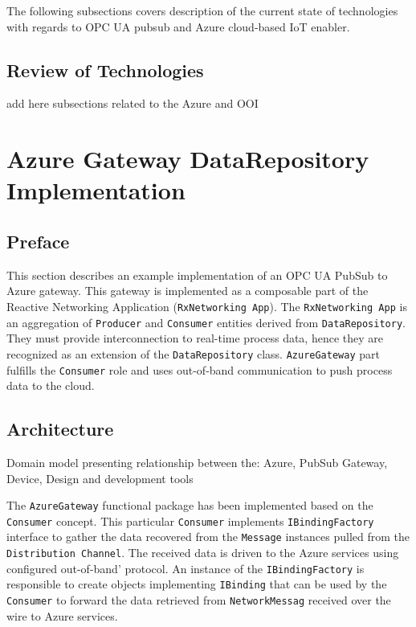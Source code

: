 \documentclass[
]{article}
\begin{document}
The following subsections covers description of the current state of
technologies with regards to OPC UA pubsub and Azure cloud-based IoT
enabler.

\hypertarget{review-of-technologies}{%
\subsection{Review of Technologies}\label{review-of-technologies}}

add here subsections related to the Azure and OOI

\hypertarget{azure-gateway-datarepository-implementation}{%
\section{Azure Gateway DataRepository
Implementation}\label{azure-gateway-datarepository-implementation}}

\hypertarget{preface}{%
\subsection{Preface}\label{preface}}

This section describes an example implementation of an OPC UA PubSub to
Azure gateway. This gateway is implemented as a composable part of the
Reactive Networking Application (\texttt{RxNetworking\ App}). The
\texttt{RxNetworking\ App} is an aggregation of \texttt{Producer} and
\texttt{Consumer} entities derived from \texttt{DataRepository}. They
must provide interconnection to real-time process data, hence they are
recognized as an extension of the \texttt{DataRepository} class.
\texttt{AzureGateway} part fulfills the \texttt{Consumer} role and uses
out-of-band communication to push process data to the cloud.

\hypertarget{architecture-1}{%
\subsection{Architecture}\label{architecture-1}}

Domain model presenting relationship between the: Azure, PubSub Gateway,
Device, Design and development tools

The \texttt{AzureGateway} functional package has been implemented based
on the \texttt{Consumer} concept. This particular \texttt{Consumer}
implements \texttt{IBindingFactory} interface to gather the data
recovered from the \texttt{Message} instances pulled from the
\texttt{Distribution\ Channel}. The received data is driven to the Azure
services using configured out-of-band' protocol. An instance of the
\texttt{IBindingFactory} is responsible to create objects implementing
\texttt{IBinding} that can be used by the \texttt{Consumer} to forward
the data retrieved from \texttt{NetworkMessag} received over the wire to
Azure services.
\end{document}
